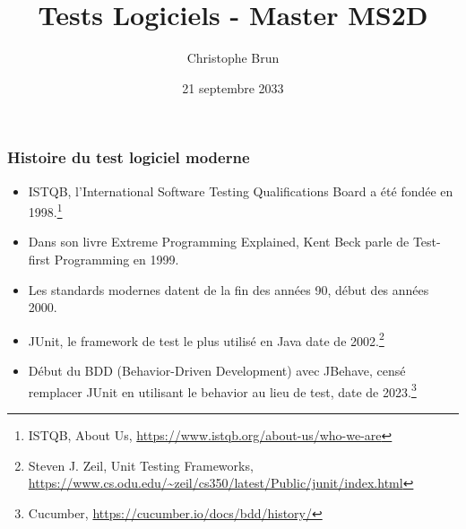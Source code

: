 \documentclass{beamer}
\title{Tests Logiciels - Master MS2D}
\author{Christophe Brun}
\institute{Campus Saint-Michel IT}
\date{21 septembre 2033}
\begin{document}
    \begin{frame}
        \transdissolve
        \titlepage
    \end{frame}

    \begin{frame}
        \frametitle{Histoire du test logiciel moderne}
        \transdissolve
        \begin{itemize}
            \item ISTQB, l’International Software Testing Qualifications Board a été fondée en 1998.\footnote{ISTQB, About Us, \url{https://www.istqb.org/about-us/who-we-are}}

            \item Dans son livre Extreme Programming Explained, Kent Beck parle de Test-first Programming en 1999.

            \item Les standards modernes datent de la fin des années 90, début des années 2000.

            \item JUnit, le framework de test le plus utilisé en Java date de 2002.\footnote{Steven J. Zeil, Unit Testing Frameworks, \url{https://www.cs.odu.edu/~zeil/cs350/latest/Public/junit/index.html}}

            \item Début du BDD (Behavior-Driven Development) avec JBehave, censé remplacer JUnit en utilisant le behavior au lieu de test, date de 2023.\footnote{Cucumber, \url{https://cucumber.io/docs/bdd/history/}}
        \end{itemize}
    \end{frame}
\end{document}

